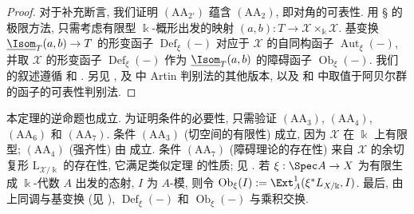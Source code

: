 \begin{proof}
对于补充断言, 我们证明 $(\mathrm{AA}_{2'})$ 蕴含 $(\mathrm{AA}_2)$, 即对角的可表性. 用 \S{} 的极限方法, 只需考虑有限型 $\Bbbk$-概形出发的映射 $(a,b):T\to\mathcal X\times_{\Bbbk}\mathcal X$. 基变换 $\underline{\Isom}_T(a,b)\to T$ 的形变函子 $\operatorname{Def}_{\xi}(-)$ 对应于 $\mathcal X$ 的自同构函子 $\operatorname{Aut}_{\xi}(-)$, 并取 $\mathcal X$ 的形变函子 $\operatorname{Def}_{\xi}(-)$ 作为 $\underline{\Isom}_T(a,b)$ 的障碍函子 $\operatorname{Ob}_{\xi}(-)$. 我们的叙述遵循 \cite[Tag 0CYF]{SP} 和 \cite[定理 A]{Hal17}. 另见 \cite{Art69b}, \cite[定理 $5.3$]{Art74b} 及 \cite[主定理]{HR19a} 中 Artin 判别法的其他版本, 以及 \cite[定理 $1$]{Mur95} 和 \cite[定理 $1$]{Mur64} 中取值于阿贝尔群的函子的可表性判别法.
\end{proof}
\begin{remark}\label{src:C.7.6}
本定理的逆命题也成立. 为证明条件的必要性, 只需验证 $(\mathrm{AA}_3)$, $(\mathrm{AA}_4)$, $(\mathrm{AA}_6)$ 和 $(\mathrm{AA}_7)$. 条件 $(\mathrm{AA}_3)$ (切空间的有限性) 成立, 因为 $\mathcal X$ 在 $\Bbbk$ 上有限型; $(\mathrm{AA}_4)$ (强齐性) 由 \cite[Tag 07WN]{SP} 成立. 条件 $(\mathrm{AA}_7)$ (障碍理论的存在性) 来自 $\mathcal X$ 的余切复形 $\mathrm L_{\mathcal X/\Bbbk}$ 的存在性, 它满足类似定理  的性质; 见 \cite{Ols06}. 若 $\xi:\Spec A\to\mathcal X$ 为有限生成 $\Bbbk$-代数 $A$ 出发的态射, $I$ 为 $A$-模, 则令 $\operatorname{Ob}_{\xi}(I):=\Ext_A^1(\xi^*L_{\mathcal X/\Bbbk},I)$. 最后, 由上同调与基变换 (见 \cite{Hal14a}), $\operatorname{Def}_{\xi}(-)$ 和 $\operatorname{Ob}_{\xi}(-)$ 与乘积交换.
\end{remark}
